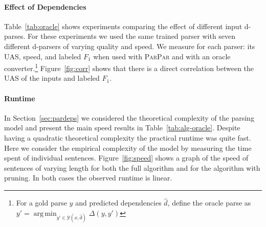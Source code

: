 \documentclass[11pt,letterpaper]{article}
\DeclareMathOperator*{\argmin}{arg\,min}
\newcommand{\ParseName}{\textsc{ParPar}\xspace}
\newcommand{\nascomment}[1]{\textcolor{blue}{\bf \small [#1 --nas]}}
\begin{document}


\paragraph{Effect of Dependencies}

Table~\ref{tab:oracle} shows experiments comparing the effect of
different input d-parses.  For these experiments we used the same
trained parser with seven different d-parsers of varying quality and
speed. We measure for each parser: its UAS, speed, and labeled $F_1$
when used with \ParseName and with an oracle converter.\footnote{For a
  gold parse $y$ and predicted dependencies $\hat{d}$, define the
  oracle parse as $y' = \argmin_{y' \in \mathcal{Y}(x, \hat{d})}
  \Delta(y, y') $} Figure~\ref{fig:corr} shows that there is a direct
correlation between the UAS of the inputs and labeled $F_1$.




\paragraph{Runtime}

In Section~\ref{sec:pardeps} we considered the theoretical 
complexity of the parsing model and present the main 
speed results in Table~\ref{tab:alg-oracle}.
Despite having a quadratic theoretical complexity
the practical runtime was quite fast.
Here we consider the empirical complexity of the 
model by measuring the time spent of individual sentences. 
Figure~\ref{fig:speed} shows a graph of the speed of
sentences of varying length for both the full algorithm
and for the algorithm with pruning. In both 
cases the observed runtime is  linear.
\end{document}
